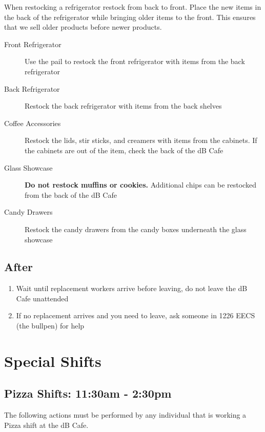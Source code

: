 \documentclass[12pt,onecolumn,letterpaper]{article}
\begin{document}
When restocking a refrigerator restock from back to front. Place the new items in the back of the refrigerator while bringing older items to the front. This ensures that we sell older products before newer products.
\begin{description}
\item [Front Refrigerator] Use the pail to restock the front refrigerator with items from the back refrigerator
\item [Back Refrigerator] Restock the back refrigerator with items from the back shelves
\item [Coffee Accessories] Restock the lids, stir sticks, and creamers with items from the cabinets. If the cabinets are out of the item, check the back of the dB Cafe
\item [Glass Showcase] \textbf{Do not restock muffins or cookies.} Additional chips can be restocked from the back of the dB Cafe
\item [Candy Drawers] Restock the candy drawers from the candy boxes underneath the glass showcase 
\end{description}
\subsection{After}
\begin{enumerate}
\item Wait until replacement workers arrive before leaving, do not leave the dB Cafe unattended
\item If no replacement arrives and you need to leave, ask someone in 1226 EECS (the bullpen) for help
\end{enumerate}
\section{Special Shifts}
\subsection{Pizza Shifts: 11:30am - 2:30pm}
The following actions must be performed by any individual that is working a Pizza shift at the dB Cafe.
\end{document}
